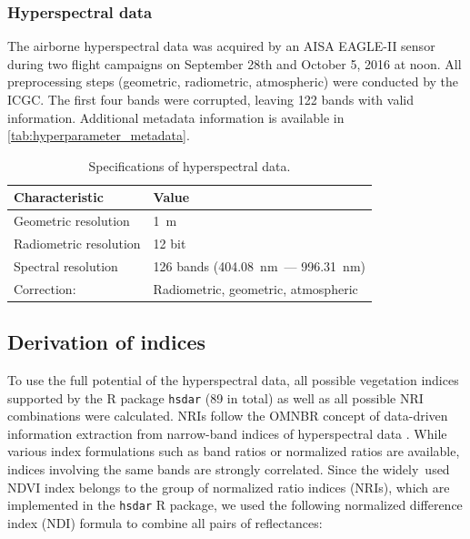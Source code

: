 \documentclass[remotesensing,article,submit,moreauthors,pdftex]{Definitions/mdpi}
\begin{document}

\subsubsection{Hyperspectral data}

The airborne hyperspectral data was acquired by an AISA EAGLE-II sensor during two flight campaigns on September 28th and October 5, 2016 at noon.
All preprocessing steps (geometric, radiometric, atmospheric) were conducted by the \ac{ICGC}.
The first four bands were corrupted, leaving 122 bands with valid information.
Additional metadata information is available in \autoref{tab:hyperparameter_metadata}.


\begin{table}[t]
	\centering
	\caption[t]{Specifications of hyperspectral data.}
	\begingroup
	\begin{tabular}{ll}
		\\
		Characteristic         & Value                               \\
		\toprule
		Geometric resolution   & 1~m                                 \\
		Radiometric resolution & 12 bit                              \\
		Spectral resolution    & 126 bands (404.08~nm~--- 996.31~nm) \\
		Correction:            & Radiometric, geometric, atmospheric
	\end{tabular}
	\endgroup\label{tab:hyperparameter_metadata}
\end{table}

\subsection{Derivation of indices}

To use the full potential of the hyperspectral data, all possible vegetation indices supported by the R package \texttt{hsdar} (89 in total) as well as all possible \ac{NRI} combinations were calculated.
NRIs follow the \ac{OMNBR} concept of data-driven information extraction from narrow-band indices of hyperspectral data \cite{thenkabail2000,thenkabail2018}.
While various index formulations such as band ratios or normalized ratios are available, indices involving the same bands are strongly correlated.
Since the widely\ used NDVI index belongs to the group of normalized ratio indices (NRIs), which are implemented in the \texttt{hsdar} R package, we used the following normalized difference index (NDI) formula to combine all pairs of reflectances:
\end{document}
